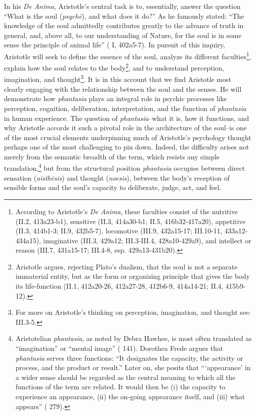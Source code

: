 \documentclass{article}
\begin{document}
In his \textit{De Anima}, Aristotle's central task is to, essentially, answer the question ``What is the soul (\textit{psychē}), and what does it do?'' As he famously stated: ``The knowledge of the soul admittedly contributes greatly to the advance of truth in general, and, above all, to our understanding of Nature, for the soul is in some sense the principle of animal life'' (\cite{aristotle2014soul} I, 402a5-7). In pursuit of this inquiry, Aristotle will seek to define the essence of the soul, analyze its different faculties\footnote{According to Aristotle's \textit{De Anima}, these faculties consist of the nutritive (II.2, 413a23-b1), sensitive (II.3, 414a30-b1; II.5, 416b32-417a20), appetitive (II.3, 414b1-3; II.9, 432b5-7), locomotive (III.9, 432a15-17; III.10-11, 433a12-434a15), imaginative (III.3, 429a12; III.3-III.4, 428a10-429a9), and intellect or reason (III.7, 431a15-17; III.4-8, esp. 429a13-431b20).}, explain how the soul relates to the body\footnote{Aristotle argues, rejecting Plato's dualism, that the soul is not a separate immaterial entity, but as the form or organizing principle that gives the body its life-function (II.1, 412a20-26, 412a27-28, 412b6-9, 414a14-21; II.4, 415b9-12).}, and to understand perception, imagination, and thought\footnote{For more on Aristotle's thinking on perception, imagination, and thought see: III.3-5.}. It is in this account that we find Aristotle most clearly engaging with the relationship between the soul and the senses. He will demonstrate how \textit{phantasia} plays an integral role in psychic processes like perception, cognition, deliberation, interpretation, and the function of \textit{phantasia} in human experience. The question of \textit{phantasia}--what it is, how it functions, and why Aristotle accords it such a pivotal role in the architecture of the soul--is one of the most crucial elements underpinning much of Aristotle's psychology thought perhaps one of the most challenging to pin down. Indeed, the difficulty arises not merely from the semantic breadth of the term, which resists any simple translation,\footnote{Aristotelian \textit{phantasia}, as noted by Debra Hawhee, is most often translated as ``imagination'' or ``mental image'' (\cite{hawhee_aristotles_eyes} 141). Dorothea Frede argues that \textit{phantasia} serves three functions: ``It designates the capacity, the activity or process, and the product or result.'' Later on, she posits that ```appearance' in a wider sense should be regarded as the central meaning to which all the functions of the term are related. It would then be (i) the capacity to experience an appearance, (ii) the on-going appearance itself, and (iii) what appears'' (\cite{frede1992cognitive} 279).} but from the structural position \textit{phantasia} occupies between direct sensation (\textit{aisthēsis}) and thought (\textit{noesis}), between the body's reception of sensible forms and the soul's capacity to deliberate, judge, act, and feel. 
\end{document}
